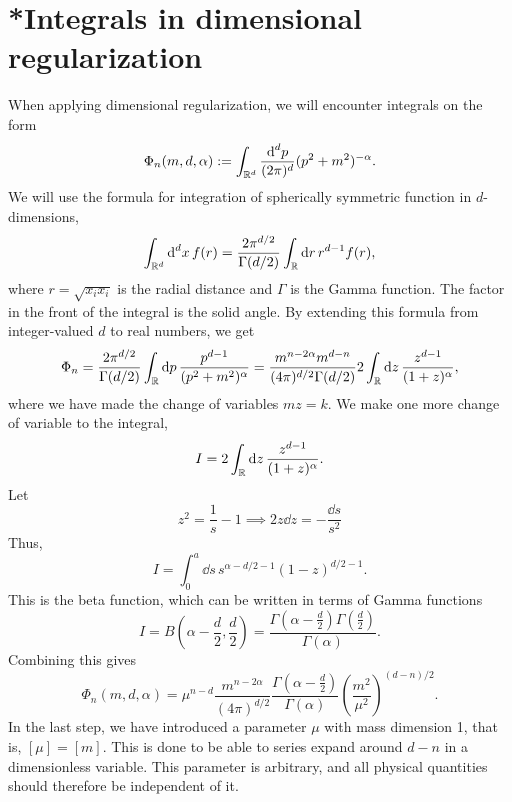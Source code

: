 \section{*Integrals in dimensional regularization}
\label{section: integral}


When applying dimensional regularization, we will encounter integrals on the form
%
\begin{equation}
    \label{def dimreg integral}
    \Phi_n(m, d, \alpha) 
    := \int_{\mathbb{R}^d} \frac{\text{d}^d p}{(2 \pi)^d} (p^2 + m^2)^{-\alpha}.
\end{equation}
%
We will use the formula for integration of spherically symmetric function in $d$-dimensions,
%
\begin{equation}
    \int_{\mathbb{R}^d} \text{d}^d x \, f(r) 
    = \frac{2 \pi^{d/2}}{\Gamma(d/2)} \int_{\mathbb{R}} \text{d} r \, r^{d-1}f(r),
\end{equation}
%
where $r = \sqrt{x_i x_i}$ is the radial distance and $\Gamma$ is the Gamma function.
The factor in the front of the integral is the solid angle.
By extending this formula from integer-valued $d$ to real numbers, we get
%
\begin{equation}
    \Phi_n
    = \frac{2 \pi^{d/2} }{\Gamma(d/2)} \int_{\mathbb{R}} \text{d} p \, 
    \frac{p^{d-1}}{(p^2 + m^2)^\alpha}
    = \frac{m^{n-2\alpha}m^{d-n} }{(4 \pi)^{d / 2}\Gamma(d/2)} 
    2 \int_{\mathbb{R}} \text{d} z \, \frac{z^{d - 1}}{(1 + z)^\alpha}, 
\end{equation}
%
where we have made the change of variables $m z = k$.
We make one more change of variable to the integral,
%
\begin{equation}
    I = 2 \int_{\mathbb{R}} \text{d} z \, \frac{z^{d - 1}}{(1 + z)^\alpha}.
\end{equation}
%
Let
%
\begin{equation}
    z^2 = \frac{1}{s} - 1 \implies 2 z \dd z = - \frac{\dd s}{s^2}
\end{equation}
%
Thus,
%
\begin{equation}
    I = \int_0^a \dd s \, s^{\alpha - d/2 - 1} (1 - z)^{d/2 - 1}.
\end{equation}
%
This is the beta function, which can be written in terms of Gamma functions~\autocite{peskinIntroductionQuantumField1995}
%
\begin{equation}
    I = B\left(\alpha - \frac{d}{2}, \frac{d}{2}\right) 
    = \frac{\Gamma\left(\alpha - \frac{d}{2}\right) \Gamma\left(\frac{d}{2}\right)}{\Gamma(\alpha)}.
\end{equation}
%
Combining this gives
%
\begin{equation}
    \label{result dimreg}
    \Phi_n(m, d, \alpha) 
    = \mu^{n-d} \frac{m^{n - 2\alpha}}{(4 \pi)^{d / 2}}
    \frac{
        \Gamma \left(\alpha - \frac{d}{2} \right) 
    }
    {\Gamma(\alpha)}
    \left(\frac{m^2}{\mu^2}\right)^{(d-n)/2 }
    .
\end{equation}
%
In the last step, we have introduced a parameter $\mu$ with mass dimension 1, that is, $[\mu] = [m]$.
This is done to be able to series expand around $d - n$ in a dimensionless variable. 
This parameter is arbitrary, and all physical quantities should therefore be independent of it.



